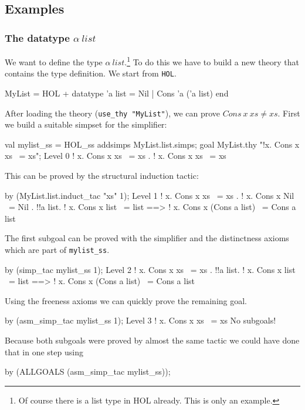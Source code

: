 \subsection{Examples}

\subsubsection{The datatype $\alpha~list$}

We want to define the type $\alpha~list$.\footnote{Of course there is a list
  type in HOL already. This is only an example.} To do this we have to build
a new theory that contains the type definition. We start from {\tt HOL}.
\begin{ttbox}
MyList = HOL +
  datatype 'a list = Nil | Cons 'a ('a list)
end
\end{ttbox}
After loading the theory (\verb$use_thy "MyList"$), we can prove
$Cons~x~xs\neq xs$.  First we build a suitable simpset for the simplifier:
\begin{ttbox}
val mylist_ss = HOL_ss addsimps MyList.list.simps;
goal MyList.thy "!x. Cons x xs ~= xs";
{\out Level 0}
{\out ! x. Cons x xs ~= xs}
{. ! x. Cons x xs ~= xs}
\end{ttbox}
This can be proved by the structural induction tactic:
\begin{ttbox}
by (MyList.list.induct_tac "xs" 1);
{\out Level 1}
{\out ! x. Cons x xs ~= xs}
{. ! x. Cons x Nil ~= Nil}
{. !!a list.}
{\out        ! x. Cons x list ~= list ==>}
{\out        ! x. Cons x (Cons a list) ~= Cons a list}
\end{ttbox}
The first subgoal can be proved with the simplifier and the distinctness
axioms which are part of \verb$mylist_ss$.
\begin{ttbox}
by (simp_tac mylist_ss 1);
{\out Level 2}
{\out ! x. Cons x xs ~= xs}
{. !!a list.}
{\out        ! x. Cons x list ~= list ==>}
{\out        ! x. Cons x (Cons a list) ~= Cons a list}
\end{ttbox}
Using the freeness axioms we can quickly prove the remaining goal.
\begin{ttbox}
by (asm_simp_tac mylist_ss 1);
{\out Level 3}
{\out ! x. Cons x xs ~= xs}
{\out No subgoals!}
\end{ttbox}
Because both subgoals were proved by almost the same tactic we could have
done that in one step using
\begin{ttbox}
by (ALLGOALS (asm_simp_tac mylist_ss));
\end{ttbox}


